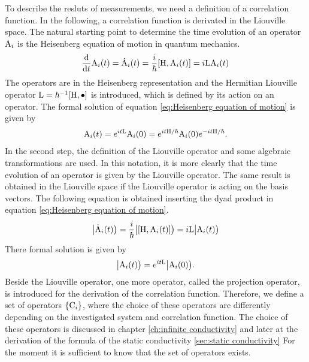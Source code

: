 To describe the resluts of measurements, we need a definition of a correlation function.
In the following, a correlation function is derivated in the Liouville space.
The natural starting point to determine the time evolution of an operator $\mathrm{A}_{i}$ is the Heisenberg equation of motion in quantum mechanics.
%
\begin{align}
	\dv{t} \mt{A}_{i}(t) = \dot{\mt{A}}_{i}(t) = \frac{i}{\hbar} \comm{\mt{H}}{\mt{A}_{i}(t)} = i \mt{L} \mt{A}_{i}(t)
	\label{eq:Heisenberg equation of motion}
\end{align}
%
The operators are in the Heisenberg representation and the Hermitian Liouville operator ${\mt{L} = \hbar^{-1} \comm{\mt{H}}{\mt{\bullet}}}$ is introduced, which is defined by its action on an operator.
The formal solution of equation \eqref{eq:Heisenberg equation of motion} is given by
%
\begin{align}
	\mathrm{A}_{i}(t) = e^{it\mathrm{L}} \mathrm{A}_{i}(0) = e^{it\mathrm{H}/\hbar} \mathrm{A}_{i}(0) e^{-it\mathrm{H}/\hbar}.
\end{align}
%
In the second step, the definition of the Liouville operator and some algebraic transformations are used.
In this notation, it is more clearly that the time evolution of an operator is given by the Liouville operator.
The same result is obtained in the Liouville space if the Liouville operator is acting on the basis vectors.
The following equation is obtained inserting the dyad product in equation \eqref{eq:Heisenberg equation of motion}.
%
\begin{align}
	\oket{\dot{\mt{A}}_{i}(t)} = \frac{i}{\hbar} \oket{\comm{\mt{H}}{\mt{A}_{i}(t)}} = i \mt{L} \oket{\mt{A}_{i}(t)}
	\label{eq:Heisenberg equation of motion in Liouville space}
\end{align}
%
There formal solution is given by
%
\begin{align}
	\big|{\mathrm{A}_{i}(t)}\big) = e^{it\mathrm{L}} \big|{\mathrm{A}_{i}(0)}\big).
	\label{eq:formal solution of EM in L}
\end{align}
%
Beside the Liouville operator, one more operator, called the projection operator, is introduced for the derivation of the correlation function.
Therefore, we define a set of operators $\{\mathrm{C}_{i}\}$, where the choice of these operators are differently depending on the investigated system and correlation function.
The choice of these operators is discussed in chapter \ref{ch:infinite conductivity} and later at the derivation of the formula of the static conductivity \ref{sec:static conductivity}
For the moment it is sufficient to know that the set of operators exists.
